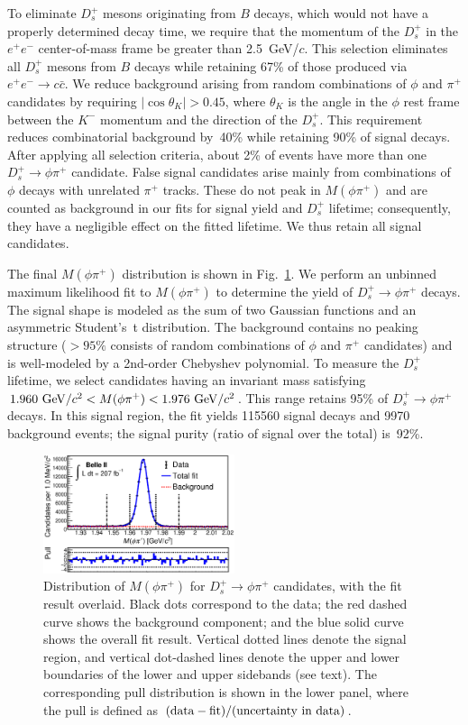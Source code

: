 \documentclass[aps,prl,twocolumn,superscriptaddress,showpacs,preprintnumbers,amsmath,amssymb]{revtex4-2}
\def\ra{\!\rightarrow\!}
\def\Dsphipi{D^+_s\ra\phi\pi^+}
\begin{document}
To eliminate $D_s^+$ mesons originating from $B$ decays, which would
not have a properly determined decay time, we require that the momentum of 
the $D_s^+$ in the $e^+e^-$ center-of-mass frame be greater than 2.5~GeV/$c$. 
This selection eliminates all $D_s^+$ mesons from $B$ decays while retaining
67\% of those produced via $e^+e^-\ra c\bar{c}$.
We reduce background arising from random combinations of $\phi$ and $\pi^+$ 
candidates by requiring $|\cos\theta_K| >0.45$, where 
$\theta_K$ is the angle in the $\phi$ rest frame between the $K^-$ 
momentum and the direction of the $D_s^+$. This requirement reduces 
combinatorial background by~40\% while retaining 90\% of signal decays. 
After applying all selection criteria, about 2\% of events have more 
than one $\Dsphipi$ candidate. 
False signal candidates arise mainly from combinations of $\phi$ decays  
with unrelated $\pi^+$ tracks. These do not peak in $M(\phi\pi^+)$ and are 
counted as background in our fits for signal yield and $D_s^+$ lifetime;
consequently, they have a negligible effect on the fitted lifetime. We thus 
retain all signal candidates.

The final $M(\phi\pi^+)$ distribution is shown in Fig.~\ref{fig:Mkkpi_plot}.
We perform an unbinned maximum likelihood fit to $M(\phi\pi^+)$ to determine
the yield of $\Dsphipi$ decays. The signal shape is modeled as the sum of 
two Gaussian functions and an asymmetric Student's~t distribution.
The background contains no peaking structure ($>\!95\%$ consists of 
random combinations of $\phi$ and $\pi^+$ candidates) and is well-modeled 
by a 2nd-order Chebyshev polynomial. To measure the $D_s^+$ lifetime, 
we select candidates having an invariant mass satisfying
$1.960~{\rm GeV}/c^2 < M(\phi\pi^+) < 1.976~{\rm GeV}/c^2$. 
This range retains 95\% of $\Dsphipi$ decays.
In this signal region, the fit yields 115560 signal decays and 9970
background events; the signal purity
(ratio of signal over the total) is~92\%.

\begin{figure}[ht]
    \centering
    \includegraphics[width=0.50\textwidth]{c1d_dsm.eps}
    \caption{Distribution of $M(\phi\pi^+)$ for $\Dsphipi$ candidates,
        with the fit result overlaid. Black dots correspond to the data; 
       the red dashed curve shows the background component; and the blue 
       solid curve shows the overall fit result.
       Vertical dotted lines denote the signal region, and 
      vertical dot-dashed lines denote the upper and lower boundaries 
      of the lower and upper sidebands (see text). 
       The corresponding pull distribution is shown 
     in the lower panel, where the pull is defined as 
     $({\rm data}-{\rm fit})/({\rm uncertainty\ in\ data})$. }
    \label{fig:Mkkpi_plot}
\end{figure}
\end{document}
